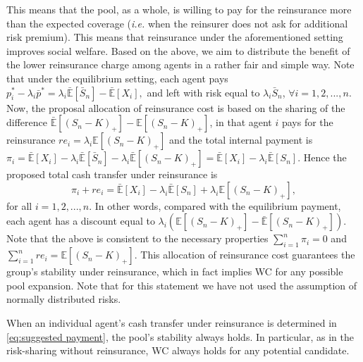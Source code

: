 \documentclass[fleqn,mnsc,nonblindrev]{informs4}
\newcommand{\EE}{\mathbb{E}}
\begin{document}
This means that the pool, as a whole, is willing to pay for the reinsurance more than the expected coverage ({\it i.e.} when the reinsurer does not ask for additional risk premium).    {This means that reinsurance under the aforementioned setting improves social welfare}. Based on the above, we aim to distribute the benefit of the lower reinsurance charge among agents in a rather fair and simple way. Note that under the equilibrium setting, each agent pays  {$p_i^*-\lambda_i\bar{p}^*=\lambda_i\bar{\EE}[\bar{S}_n]-\bar{\EE}[X_i],$} and left with risk equal to $\lambda_i\bar{S}_n$, $\forall i=1,2,...,n$. Now, the proposal allocation of reinsurance cost is based on the sharing of the difference $\bar{\EE}[(S_n-K)_+]-\EE[(S_n-K)_+]$, in that agent $i$ pays for the reinsurance
$re_i=\lambda_i\EE[(S_n-K)_+]$ and the total internal payment is  {$\pi_i= \bar{\EE}[X_i]-\lambda_i\bar{\EE}[\bar{S}_n]-\lambda_i\bar{\EE}[(S_n-K)_+]=\bar{\EE}[X_i]-\lambda_i\bar{\EE}[S_n].$} Hence the proposed total cash transfer under reinsurance is 
\begin{equation}\label{eq:suggested payment}
\pi_i+re_i=\bar{\EE}[X_i]-\lambda_i\bar{\EE}[S_n]+\lambda_i\EE[(S_n-K)_+],
\end{equation}
for all $i=1,2,...,n.$ In other words, compared with the equilibrium payment, each agent has a discount equal to  {$\lambda_i(\EE[(S_n-K)_+]-\bar{\EE}[(S_n-K)_+]).$} Note that the above is consistent to the necessary properties $\sum_{i=1}^n\pi_i=0$ and $\sum_{i=1}^n re_i=\EE[(S_n-K)_+]$. This allocation of reinsurance cost guarantees the group's stability under reinsurance, which in fact implies WC for any possible pool expansion. Note that for this statement we have not used the assumption of normally distributed risks.

\begin{theorem}\label{thm:reinsurance stability and weak consensus}
When an individual agent's cash transfer under reinsurance is determined in \eqref{eq:suggested payment}, the pool's stability always holds. In particular, as in the risk-sharing without reinsurance, WC always holds for any potential candidate.  
\end{theorem}
\end{document}
